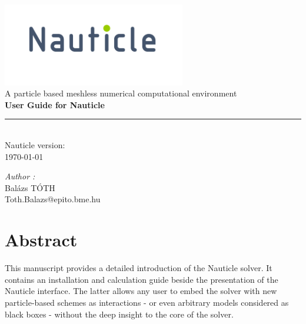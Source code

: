 \documentclass[a4paper,12pt,openany]{book}
\theoremstyle{break}
\begin{document}
\frontmatter
\begin{titlepage}
\begin{center}
\vspace{5cm}
\includegraphics[width=0.6\textwidth]{nauticle_logo.pdf}\\[0.5cm]
{\large A particle based meshless numerical computational environment}\\ [5cm]
{ \huge \bfseries User Guide for Nauticle \\[0.2cm] }
\color{nauticlegreen}
\rule{\linewidth}{1.5mm} \\[0.5cm]
\color{black}
{\large Nauticle version: \nauticleversion{} \\ \today}
\vfill
\noindent
\begin{minipage}{1\textwidth}
  \begin{flushright} \large
    \emph{Author :}\\
    Balázs TÓTH \\
    Toth.Balazs@epito.bme.hu
  \end{flushright}
\end{minipage}
\end{center}
\end{titlepage}
\clearpage\mbox{}\clearpage
\chapter{Abstract}
This manuscript provides a detailed introduction of the Nauticle solver. It contains an installation and calculation guide beside the presentation of the Nauticle interface. The latter allows any user to embed the solver with new particle-based schemes as interactions - or even arbitrary models considered as black boxes - without the deep insight to the core of the solver.

\tableofcontents
\newpage
\mainmatter
\end{document}
